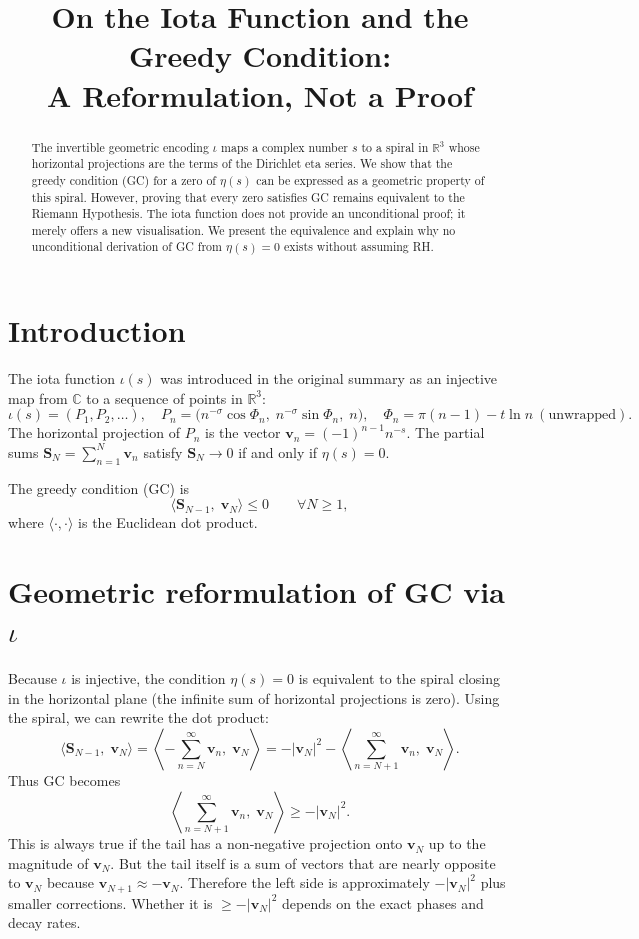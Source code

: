 \documentclass[12pt,a4paper]{article}
\title{On the Iota Function and the Greedy Condition: \\ A Reformulation, Not a Proof}
\author{}
\date{}
\begin{document}
\maketitle

\begin{abstract}
The invertible geometric encoding \(\iota\) maps a complex number \(s\) to a spiral in \(\mathbb{R}^3\) whose horizontal projections are the terms of the Dirichlet eta series. We show that the greedy condition (GC) for a zero of \(\eta(s)\) can be expressed as a geometric property of this spiral. However, proving that every zero satisfies GC remains equivalent to the Riemann Hypothesis. The iota function does not provide an unconditional proof; it merely offers a new visualisation. We present the equivalence and explain why no unconditional derivation of GC from \(\eta(s)=0\) exists without assuming RH.
\end{abstract}

\section{Introduction}

The iota function \(\iota(s)\) was introduced in the original summary as an injective map from \(\mathbb{C}\) to a sequence of points in \(\mathbb{R}^3\):
\[
\iota(s) = (P_1,P_2,\dots),\quad 
P_n = \bigl(n^{-\sigma}\cos\Phi_n,\; n^{-\sigma}\sin\Phi_n,\; n\bigr),\quad 
\Phi_n = \pi(n-1)-t\ln n\ (\text{unwrapped}).
\]
The horizontal projection of \(P_n\) is the vector \(\mathbf{v}_n = (-1)^{n-1}n^{-s}\). The partial sums \(\mathbf{S}_N = \sum_{n=1}^N \mathbf{v}_n\) satisfy \(\mathbf{S}_N \to 0\) if and only if \(\eta(s)=0\).

The greedy condition (GC) is
\[
\langle \mathbf{S}_{N-1},\; \mathbf{v}_N \rangle \le 0 \qquad \forall N\ge 1,
\]
where \(\langle\cdot,\cdot\rangle\) is the Euclidean dot product.

\section{Geometric reformulation of GC via \(\iota\)}

Because \(\iota\) is injective, the condition \(\eta(s)=0\) is equivalent to the spiral closing in the horizontal plane (the infinite sum of horizontal projections is zero). Using the spiral, we can rewrite the dot product:
\[
\langle \mathbf{S}_{N-1},\; \mathbf{v}_N \rangle = \left\langle -\sum_{n=N}^{\infty} \mathbf{v}_n,\; \mathbf{v}_N \right\rangle = -|\mathbf{v}_N|^2 - \left\langle \sum_{n=N+1}^{\infty} \mathbf{v}_n,\; \mathbf{v}_N \right\rangle.
\]
Thus GC becomes
\[
\left\langle \sum_{n=N+1}^{\infty} \mathbf{v}_n,\; \mathbf{v}_N \right\rangle \ge -|\mathbf{v}_N|^2.
\]
This is always true if the tail has a non‑negative projection onto \(\mathbf{v}_N\) up to the magnitude of \(\mathbf{v}_N\). But the tail itself is a sum of vectors that are nearly opposite to \(\mathbf{v}_N\) because \(\mathbf{v}_{N+1} \approx -\mathbf{v}_N\). Therefore the left side is approximately \(-|\mathbf{v}_N|^2\) plus smaller corrections. Whether it is \(\ge -|\mathbf{v}_N|^2\) depends on the exact phases and decay rates.
\end{document}
